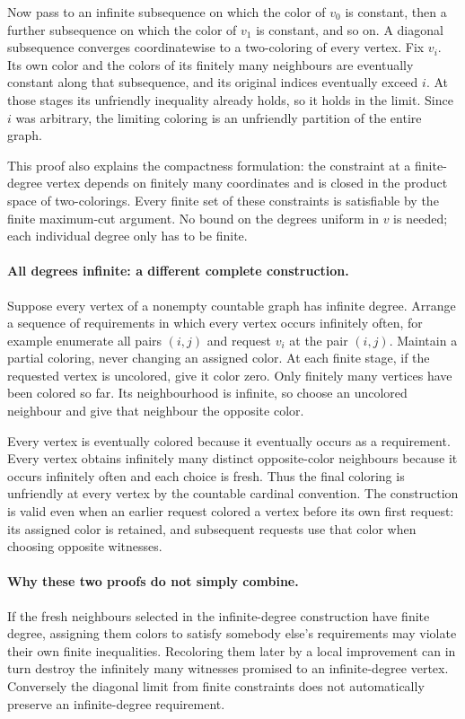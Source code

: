 \documentclass[11pt,a4paper]{article}
\begin{document}
Now pass to an infinite subsequence on which the color of $v_0$ is
constant, then a further subsequence on which the color of $v_1$ is
constant, and so on. A diagonal subsequence converges coordinatewise
to a two-coloring of every vertex. Fix $v_i$. Its own color and the
colors of its finitely many neighbours are eventually constant along
that subsequence, and its original indices eventually exceed $i$.
At those stages its unfriendly inequality already holds, so it holds
in the limit. Since $i$ was arbitrary, the limiting coloring is an
unfriendly partition of the entire graph.

This proof also explains the compactness formulation: the constraint
at a finite-degree vertex depends on finitely many coordinates and
is closed in the product space of two-colorings. Every finite set of
these constraints is satisfiable by the finite maximum-cut argument.
No bound on the degrees uniform in $v$ is needed; each individual
degree only has to be finite.

\paragraph{All degrees infinite: a different complete construction.}
Suppose every vertex of a nonempty countable graph has infinite degree.
Arrange a sequence of requirements in which every vertex occurs
infinitely often, for example enumerate all pairs $(i,j)$ and request
$v_i$ at the pair $(i,j)$. Maintain a partial coloring, never changing
an assigned color. At each finite stage, if the requested vertex is
uncolored, give it color zero. Only finitely many vertices have been
colored so far. Its neighbourhood is infinite, so choose an uncolored
neighbour and give that neighbour the opposite color.

Every vertex is eventually colored because it eventually occurs as a
requirement. Every vertex obtains infinitely many distinct opposite-color
neighbours because it occurs infinitely often and each choice is fresh.
Thus the final coloring is unfriendly at every vertex by the countable
cardinal convention. The construction is valid even when an earlier
request colored a vertex before its own first request: its assigned
color is retained, and subsequent requests use that color when choosing
opposite witnesses.

\paragraph{Why these two proofs do not simply combine.}
If the fresh neighbours selected in the infinite-degree construction
have finite degree, assigning them colors to satisfy somebody else's
requirements may violate their own finite inequalities. Recoloring
them later by a local improvement can in turn destroy the infinitely
many witnesses promised to an infinite-degree vertex. Conversely the
diagonal limit from finite constraints does not automatically preserve
an infinite-degree requirement.
\end{document}
